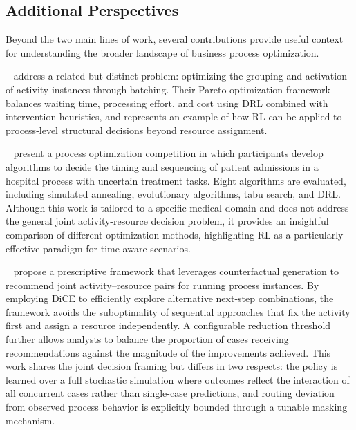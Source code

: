 \documentclass[journal,onecolumn]{IEEEtran}
\begin{document}
\subsection{Additional Perspectives}
\label{subsec:soa_additional}

Beyond the two main lines of work, several contributions provide
useful context for understanding the broader landscape of business
process optimization.

\citeauthor{Optimization_of_Activity_Batching_Policies}~\cite{Optimization_of_Activity_Batching_Policies}
address a related but distinct problem: optimizing the grouping and
activation of activity instances through batching. Their Pareto
optimization framework balances waiting time, processing effort, and
cost using DRL combined with intervention heuristics, and represents
an example of how RL can be applied to process-level structural
decisions beyond resource assignment.

\citeauthor{The_Business_Process_Optimization_Competition}~\cite{The_Business_Process_Optimization_Competition}
present a process optimization competition in which participants
develop algorithms to decide the timing and sequencing of patient
admissions in a hospital process with uncertain treatment tasks.
Eight algorithms are evaluated, including simulated annealing,
evolutionary algorithms, tabu search, and DRL. Although this work
is tailored to a specific medical domain and does not address the
general joint activity-resource decision problem, it provides an
insightful comparison of different optimization methods, highlighting
RL as a particularly effective paradigm for time-aware scenarios.

\citeauthor{Leveraging_Counterfactuals}~\cite{Leveraging_Counterfactuals}
propose a prescriptive framework that leverages counterfactual generation
to recommend joint activity--resource pairs for running process instances.
By employing DiCE to efficiently explore alternative next-step combinations,
the framework avoids the suboptimality of sequential approaches that fix
the activity first and assign a resource independently. A configurable
reduction threshold further allows analysts to balance the proportion
of cases receiving recommendations against the magnitude of the improvements
achieved. This work shares the joint decision framing but differs in
two respects: the policy is learned over a full stochastic simulation
where outcomes reflect the interaction of all concurrent cases rather
than single-case predictions, and routing deviation from observed process
behavior is explicitly bounded through a tunable masking mechanism.
\end{document}
